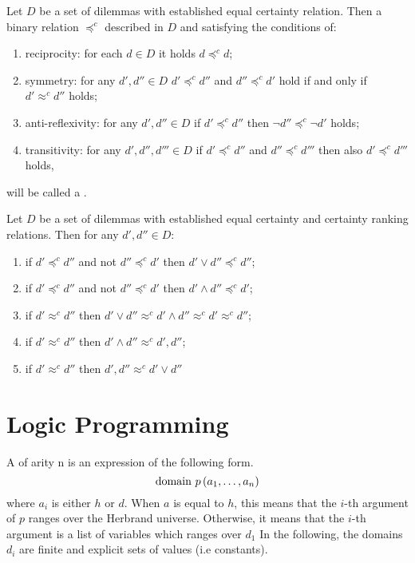 \begin{defi}
Let $D$ be a set of dilemmas with established equal certainty relation. Then a binary relation $\preceq^c$ described in $D$ and satisfying the conditions of:
\begin{enumerate}
 \item reciprocity: for each $d\in D$ it holds $d\preceq^c d$;
 \item symmetry: for any $d',d''\in D$ $d'\preceq^c d''$ and $d''\preceq^c d'$ hold if and only if $d'\approx^c d''$ holds;
 \item anti-reflexivity: for any $d',d''\in D$ if $d'\preceq^c d''$ then $\neg d''\preceq^c\neg d'$ holds;
 \item transitivity: for any $d',d'',d'''\in D$ if $d'\preceq^c d''$ and $d''\preceq^c d'''$ then also $d'\preceq^c d'''$ holds,
\end{enumerate}
will be called a .
\cite{conf/fedcsis/Kulikowski12}
\end{defi}

\begin{theo}
Let $D$ be a set of dilemmas with established equal certainty and certainty ranking relations. Then for any $d',d''\in D$:
\begin{enumerate}
\item if $d'\preceq^c d''$ and not $d''\preceq^c d'$ then $d'\vee d''\preceq^c d''$;
\item if $d'\preceq^c d''$ and not $d''\preceq^c d'$ then $d'\wedge d''\preceq^c d'$;
\item if $d'\approx^c d''$ then $d'\vee d''\approx^c d'\wedge d''\approx^c d'\approx^c d''$;
\item if $d'\approx^c d''$ then $d'\wedge d''\approx^c d',d''$;
\item if $d'\approx^c d''$ then $d',d''\approx^c d'\vee d''$
\end{enumerate}
\cite{conf/fedcsis/Kulikowski12}
\end{theo}

\section{Logic Programming}

\begin{defi}
A  of arity n is an expression of the following form.
\begin{equation}
\mbox{domain }p\left(a_1,\ldots ,a_n\right)
\end{equation}
where $a_i$ is either $h$ or $d$. When $a$ is equal to $h$, this means that the $i$-th argument of $p$ ranges over the Herbrand universe. Otherwise, it means that the $i$-th argument is a list of variables which ranges over $d_1$ In the following, the domains $d_i$ are finite and explicit sets of values (i.e constants).
\cite{conf/ijcai/Hentenryck87}
\end{defi}

